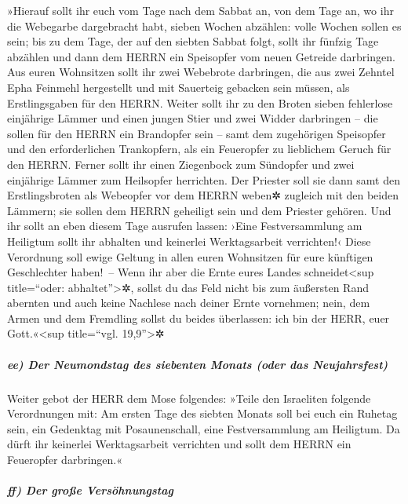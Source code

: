 »Hierauf sollt ihr euch vom Tage nach dem Sabbat an, von
dem Tage an, wo ihr die Webegarbe dargebracht habt, sieben Wochen
abzählen: volle Wochen sollen es sein; bis zu dem Tage,
der auf den siebten Sabbat folgt, sollt ihr fünfzig Tage abzählen und
dann dem HERRN ein Speisopfer vom neuen Getreide darbringen.
Aus euren Wohnsitzen sollt ihr zwei Webebrote darbringen,
die aus zwei Zehntel Epha Feinmehl hergestellt und mit Sauerteig
gebacken sein müssen, als Erstlingsgaben für den HERRN.
Weiter sollt ihr zu den Broten sieben fehlerlose
einjährige Lämmer und einen jungen Stier und zwei Widder darbringen --
die sollen für den HERRN ein Brandopfer sein -- samt dem zugehörigen
Speisopfer und den erforderlichen Trankopfern, als ein Feueropfer zu
lieblichem Geruch für den HERRN. Ferner sollt ihr einen
Ziegenbock zum Sündopfer und zwei einjährige Lämmer zum Heilsopfer
herrichten. Der Priester soll sie dann samt den
Erstlingsbroten als Webeopfer vor dem HERRN weben✲ zugleich mit den
beiden Lämmern; sie sollen dem HERRN geheiligt sein und dem Priester
gehören. Und ihr sollt an eben diesem Tage ausrufen
lassen: ›Eine Festversammlung am Heiligtum sollt ihr abhalten und
keinerlei Werktagsarbeit verrichten!‹ Diese Verordnung soll ewige
Geltung in allen euren Wohnsitzen für eure künftigen Geschlechter
haben!~-- Wenn ihr aber die Ernte eures Landes
schneidet\textless sup title=``oder: abhaltet''\textgreater✲, sollst du
das Feld nicht bis zum äußersten Rand abernten und auch keine Nachlese
nach deiner Ernte vornehmen; nein, dem Armen und dem Fremdling sollst du
beides überlassen: ich bin der HERR, euer Gott.«\textless sup
title=``vgl. 19,9''\textgreater✲

\hypertarget{ee-der-neumondstag-des-siebenten-monats-oder-das-neujahrsfest}{%
\subparagraph{ee) Der Neumondstag des siebenten Monats (oder das
Neujahrsfest)}\label{ee-der-neumondstag-des-siebenten-monats-oder-das-neujahrsfest}}

Weiter gebot der HERR dem Mose folgendes:
»Teile den Israeliten folgende Verordnungen mit: Am
ersten Tage des siebten Monats soll bei euch ein Ruhetag sein, ein
Gedenktag mit Posaunenschall, eine Festversammlung am Heiligtum.
Da dürft ihr keinerlei Werktagsarbeit verrichten und
sollt dem HERRN ein Feueropfer darbringen.«

\hypertarget{ff-der-grouxdfe-versuxf6hnungstag}{%
\subparagraph{ff) Der große
Versöhnungstag}\label{ff-der-grouxdfe-versuxf6hnungstag}}

